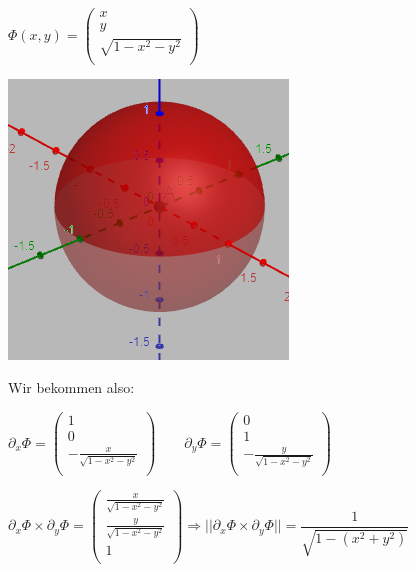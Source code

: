 \documentclass[a4paper, fontsize = 8pt, landscape]{scrartcl}
\begin{document}
\begin{multicols*}{3}
    \begin{center}
        \begin{minipage}{0.6\linewidth}
            \begin{center}
                $\Phi(x,y) = \begin{pmatrix}
                        x \\ y \\ \sqrt{1 - x^2 - y^2} \\
                    \end{pmatrix}$
            \end{center}
        \end{minipage}
        \begin{minipage}{0.39\linewidth}
            \begin{center}
                \includegraphics[width=0.4\linewidth]{Bilder/Oberflachenintegral_BSP.png}
            \end{center}
        \end{minipage}
    \end{center}

    Wir bekommen also:

    \begin{center}
        $\partial_x \Phi = \begin{pmatrix}
                1 \\ 0 \\ - \frac{x}{\sqrt{1 - x^2 - y^2}} \\
            \end{pmatrix} \qquad \partial_y \Phi = \begin{pmatrix}
                0 \\ 1 \\ - \frac{y}{\sqrt{1 - x^2 - y^2}} \\
            \end{pmatrix}$ \medskip

        $\partial_x \Phi \times \partial_y \Phi = \begin{pmatrix}
                \frac{x}{\sqrt{1 - x^2 - y^2}} \\ \frac{y}{\sqrt{1 - x^2 - y^2}} \\ 1 \\
            \end{pmatrix} \Rightarrow || \partial_x \Phi \times \partial_y \Phi || = \dfrac{1}{\sqrt{1 - (x^2 + y^2)}}$
    \end{center}


\end{multicols*}
\end{document}
